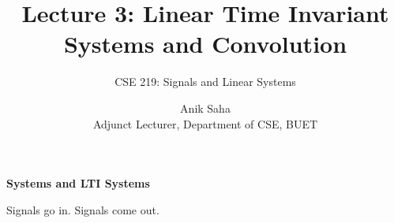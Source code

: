 \documentclass[aspectratio=169,11pt]{beamer}
\title{Lecture 3: Linear Time Invariant Systems and Convolution}
\subtitle{CSE 219: Signals and Linear Systems}
\author{Anik Saha\\[-1pt]{\small Adjunct Lecturer, Department of CSE, BUET}}
\date{}
\begin{document}

\begin{frame}[plain]
\vspace{0.55cm}
\titlepage



\end{frame}


\begin{frame}[plain]

\vfill

\begin{center}

{\fontsize{30}{34}\selectfont\bfseries\color{FrameTitleColor}
Systems and LTI Systems\par}

\vspace{0.25cm}

{\Large\color{ThemeGray}
Signals go in. Signals come out.\par}

\end{center}

\vfill

\end{frame}
\end{document}
